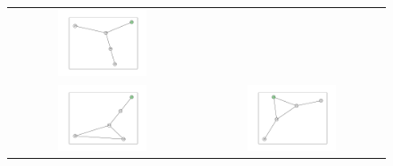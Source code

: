 \documentclass[12pt, a4paper]{extarticle}
\begin{document}
\begin{figure}
\begin{tabularx}{\textwidth}{cc}
\includegraphics[width=0.5\textwidth]{task11-graphlets/5_10-16-18-19-23.pdf} \\
\includegraphics[width=0.5\textwidth]{task11-graphlets/5_10-14-16-21-23.pdf} &
\includegraphics[width=0.5\textwidth]{task11-graphlets/5_16-21-25-22-23.pdf} \\
\end{tabularx}\end{figure}
\end{document}
